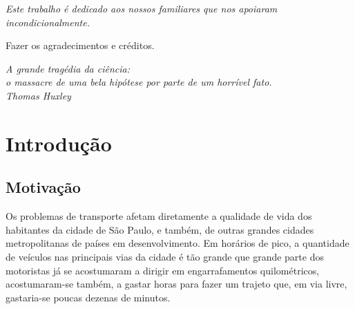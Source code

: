 \documentclass[
	12pt,					%
	openright,		%
	oneside,			%
	a4paper,			%
	english,			%
	french,				%
	spanish,			%
	brazil,				%
	]{abntex2}
\begin{document}
\begin{dedicatoria}
   \vspace*{\fill}
   \centering
   \noindent
   \textit{ Este trabalho é dedicado aos nossos familiares que nos 
	apoiaram incondicionalmente. } \vspace*{\fill}
\end{dedicatoria}

\begin{agradecimentos}

Fazer os agradecimentos e créditos. 

\end{agradecimentos}

\begin{epigrafe}
    \vspace*{\fill}
	\begin{flushright}
		\textit{A grande tragédia da ciência: \\
		o massacre de uma bela hipótese por parte de um horrível fato.
		\\Thomas Huxley}
	\end{flushright}
\end{epigrafe}



\listoffigures*
\cleardoublepage

\listoftables*
\cleardoublepage

\tableofcontents*
\cleardoublepage

\textual

\chapter{Introdução}

\section{Motivação}

Os problemas de transporte afetam diretamente a qualidade de vida dos habitantes da cidade de São Paulo, e também, de outras grandes cidades metropolitanas de países em desenvolvimento.
Em horários de pico, a quantidade de veículos nas principais vias da cidade é tão grande que grande parte dos motoristas já se acostumaram a dirigir em engarrafamentos quilométricos, acostumaram-se também, a gastar horas para fazer um trajeto que, em via livre, gastaria-se poucas dezenas de minutos.
\end{document}
